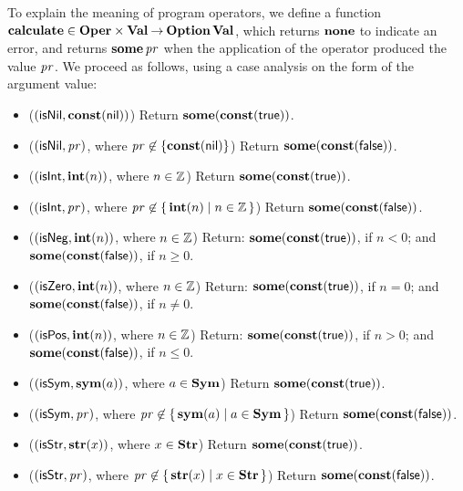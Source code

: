 To explain the meaning of program operators, we define a function
%
$\mathbf{calculate}\in\mathbf{Oper}\times\mathbf{Val}\mathbin{\to}\mathbf{Option}\,\mathbf{Val}$, which returns
$\mathbf{none}$ to indicate an error, and returns $\mathbf{some}\,\mathit{pr}$ when the
application of the operator produced the value $\mathit{pr}$.  We proceed
as follows, using a case analysis on the form of the argument
value:
\begin{itemize}
\item ($(\mathsf{isNil}, \mathbf{const}(\mathsf{nil}))$)
  Return $\mathbf{some}(\mathbf{const}(\mathsf{true}))$.

\item ($(\mathsf{isNil}, \mathit{pr})$, where $\mathit{pr}\not\in\{\mathbf{const}(\mathsf{nil})\}$)
  Return $\mathbf{some}(\mathbf{const}(\mathsf{false}))$.

\item ($(\mathsf{isInt}, \mathbf{int}(n))$, where $n\in\mathbb{Z}$)
  Return $\mathbf{some}(\mathbf{const}(\mathsf{true}))$.

\item ($(\mathsf{isInt}, \mathit{pr})$, where $\mathit{pr}\not\in\{ \, \mathbf{int}(n) \mid n\in\mathbb{Z} \, \}$)
  Return $\mathbf{some}(\mathbf{const}(\mathsf{false}))$.

\item ($(\mathsf{isNeg}, \mathbf{int}(n))$, where $n\in\mathbb{Z}$)
  Return: $\mathbf{some}(\mathbf{const}(\mathsf{true}))$, if $n < 0$;
  and $\mathbf{some}(\mathbf{const}(\mathsf{false}))$, if $n\geq 0$.

\item ($(\mathsf{isZero}, \mathbf{int}(n))$, where $n\in\mathbb{Z}$)
  Return: $\mathbf{some}(\mathbf{const}(\mathsf{true}))$, if $n = 0$;
  and $\mathbf{some}(\mathbf{const}(\mathsf{false}))$, if $n\neq 0$.

\item ($(\mathsf{isPos}, \mathbf{int}(n))$, where $n\in\mathbb{Z}$)
  Return: $\mathbf{some}(\mathbf{const}(\mathsf{true}))$, if $n > 0$;
  and $\mathbf{some}(\mathbf{const}(\mathsf{false}))$, if $n\leq 0$.

\item ($(\mathsf{isSym}, \mathbf{sym}(a))$, where $a\in\mathbf{Sym}$)
  Return $\mathbf{some}(\mathbf{const}(\mathsf{true}))$.

\item ($(\mathsf{isSym}, \mathit{pr})$, where $\mathit{pr}\not\in\{ \, \mathbf{sym}(a) \mid a\in\mathbf{Sym} \, \}$)
   Return $\mathbf{some}(\mathbf{const}(\mathsf{false}))$.

\item ($(\mathsf{isStr}, \mathbf{str}(x))$, where $x\in\mathbf{Str}$)
  Return $\mathbf{some}(\mathbf{const}(\mathsf{true}))$.

\item ($(\mathsf{isStr}, \mathit{pr})$, where $\mathit{pr}\not\in\{ \, \mathbf{str}(x) \mid x\in\mathbf{Str} \, \}$)
   Return $\mathbf{some}(\mathbf{const}(\mathsf{false}))$.


\end{itemize}
